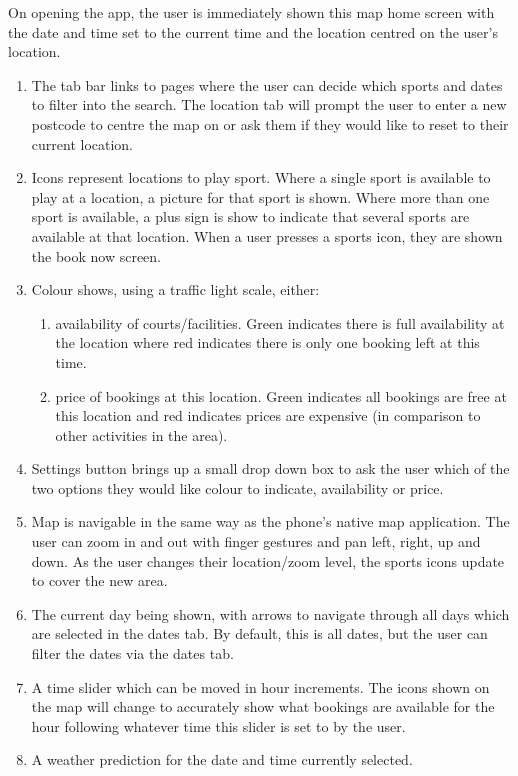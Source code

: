 On opening the app, the user is immediately shown this map home screen with the
date and time set to the current time and the location centred on the user's
location.
\begin{enumerate}
	\item The tab bar links to pages where the user can decide which sports and
		dates to filter into the search. The location tab will prompt the user
		to enter a new postcode to centre the map on or ask them if they would
		like to reset to their current location.
	\item Icons represent locations to play sport. Where a single sport is
		available to play at a location, a picture for that sport is shown.
		Where more than one sport is available, a plus sign is show to indicate
		that several sports are available at that location. When a user presses
		a sports icon, they are shown the book now screen.
	\item Colour shows, using a traffic light scale, either:
		\begin{enumerate}
			\item availability of courts/facilities. Green indicates there is
				full availability at the location where red indicates there is
				only one booking left at this time.
			\item price of bookings at this location. Green indicates all
				bookings are free at this location and red indicates prices are
				expensive (in comparison to other activities in the area).
		\end{enumerate}

	\item Settings button brings up a small drop down box to ask the user which
		of the two options they would like colour to indicate, availability or
		price.
	\item Map is navigable in the same way as the phone's native map
		application.  The user can zoom in and out with finger gestures and pan
		left, right, up and down. As the user changes their location/zoom
		level, the sports icons update to cover the new area.
	\item The current day being shown, with arrows to navigate through all days
		which are selected in the dates tab. By default, this is all dates, but
		the user can filter the dates via the dates tab.
	\item A time slider which can be moved in hour increments. The icons shown
		on the map will change to accurately show what bookings are available
		for the hour following whatever time this slider is set to by the user.
	\item A weather prediction for the date and time currently selected.
\end{enumerate}

